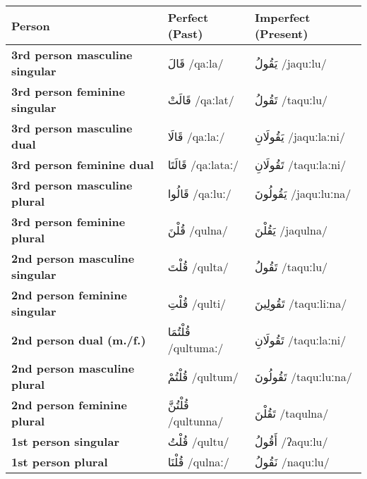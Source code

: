 \documentclass[letterpaper,12pt]{article}
\begin{document}
\begin{longtable}{|>{\raggedright}p{3.5cm}|p{5cm}|p{5cm}|}
\hline
\textbf{Person} & \textbf{Perfect (Past)} & \textbf{Imperfect (Present)} \\
\hline
\textbf{3rd person masculine singular} & \textarabic{قَالَ} /qaːla/ & \textarabic{يَقُولُ} /jaquːlu/ \\
\hline
\textbf{3rd person feminine singular} & \textarabic{قَالَتْ} /qaːlat/ & \textarabic{تَقُولُ} /taquːlu/ \\
\hline
\textbf{3rd person masculine dual} & \textarabic{قَالَا} /qaːlaː/ & \textarabic{يَقُولَانِ} /jaquːlaːni/ \\
\hline
\textbf{3rd person feminine dual} & \textarabic{قَالَتَا} /qaːlataː/ & \textarabic{تَقُولَانِ} /taquːlaːni/ \\
\hline
\textbf{3rd person masculine plural} & \textarabic{قَالُوا} /qaːluː/ & \textarabic{يَقُولُونَ} /jaquːluːna/ \\
\hline
\textbf{3rd person feminine plural} & \textarabic{قُلْنَ} /qulna/ & \textarabic{يَقُلْنَ} /jaqulna/ \\
\hline
\textbf{2nd person masculine singular} & \textarabic{قُلْتَ} /qulta/ & \textarabic{تَقُولُ} /taquːlu/ \\
\hline
\textbf{2nd person feminine singular} & \textarabic{قُلْتِ} /qulti/ & \textarabic{تَقُولِينَ} /taquːliːna/ \\
\hline
\textbf{2nd person dual (m./f.)} & \textarabic{قُلْتُمَا} /qultumaː/ & \textarabic{تَقُولَانِ} /taquːlaːni/ \\
\hline
\textbf{2nd person masculine plural} & \textarabic{قُلْتُمْ} /qultum/ & \textarabic{تَقُولُونَ} /taquːluːna/ \\
\hline
\textbf{2nd person feminine plural} & \textarabic{قُلْتُنَّ} /qultunna/ & \textarabic{تَقُلْنَ} /taqulna/ \\
\hline
\textbf{1st person singular} & \textarabic{قُلْتُ} /qultu/ & \textarabic{أَقُولُ} /ʔaquːlu/ \\
\hline
\textbf{1st person plural} & \textarabic{قُلْنَا} /qulnaː/ & \textarabic{نَقُولُ} /naquːlu/ \\
\hline
\end{longtable}
\end{document}
